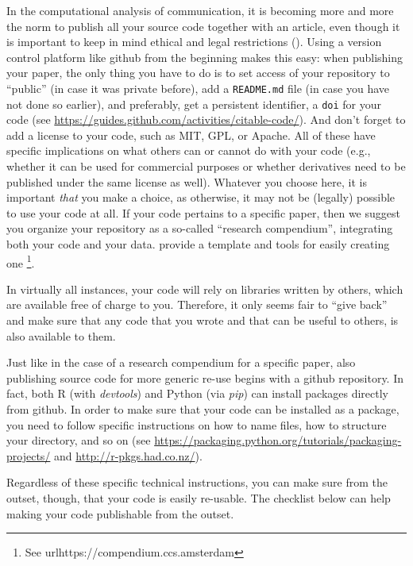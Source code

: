In the computational analysis of communication, it is becoming more and
more the norm to publish all your source code together with an
article, even though it is important to keep in mind ethical and legal
restrictions (\cite{VanAtteveldt2019}). Using a version control
platform like github from the beginning makes this easy: when
publishing your paper, the only thing you have to do is to set access
of your repository to ``public'' (in case it was private before), add
a \verb|README.md| file (in case you have not done so earlier), and
preferably, get a persistent identifier, a \verb|doi| for your
code (see \url{https://guides.github.com/activities/citable-code/}).
And don't forget to add a license to your code, such as MIT, GPL, or
Apache. All of these have specific implications on what others can or
cannot do with your code (e.g., whether it can be used for commercial
purposes or whether derivatives need to be published under the same license as well). Whatever you choose here, it is important \emph{that} you make a choice, as otherwise, it may not be (legally) possible to use
your code at all.
If your code pertains to a specific paper, then we suggest you organize
your repository as a so-called ``research compendium'', integrating
both your code and your data.
\cite{compendium} provide a template and tools for easily creating one%
\footnote{See url{https://compendium.ccs.amsterdam}}.

In virtually all instances, your code will rely on libraries written
by others, which are available free of charge to you. Therefore,
it only seems fair to ``give back'' and make sure that any code that
you wrote and that can be useful to others, is also available to them.

Just like in the case of a research compendium for a specific paper,
also publishing source code for more generic re-use begins with a
github repository. In fact, both R (with \emph{devtools}) and Python
(via \emph{pip}) can install packages directly from github. In order
to make sure that your code can be installed as a package, you
need to follow specific instructions on how to name files, how to
structure your directory, and so on (see \url{https://packaging.python.org/tutorials/packaging-projects/}
and \url{http://r-pkgs.had.co.nz/}).

Regardless of these specific technical instructions, you can make
sure from the outset, though, that your code is easily re-usable.
The checklist below can help making your code publishable from the
outset.

